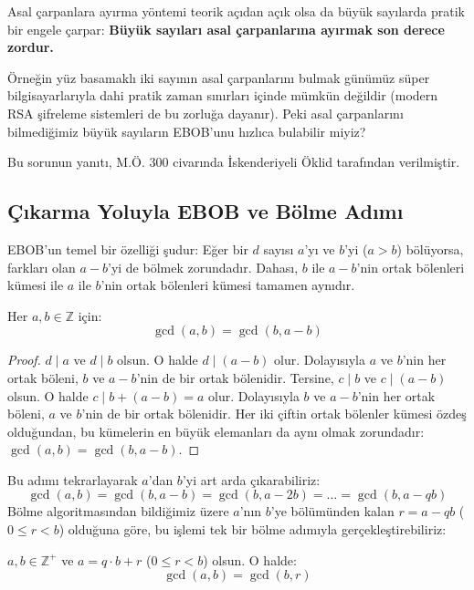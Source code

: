 Asal çarpanlara ayırma yöntemi teorik açıdan açık olsa da büyük sayılarda pratik bir engele çarpar: \textbf{Büyük sayıları asal çarpanlarına ayırmak son derece zordur.}

Örneğin yüz basamaklı iki sayının asal çarpanlarını bulmak günümüz süper bilgisayarlarıyla dahi pratik zaman sınırları içinde mümkün değildir (modern RSA şifreleme sistemleri de bu zorluğa dayanır). Peki asal çarpanlarını bilmediğimiz büyük sayıların EBOB'unu hızlıca bulabilir miyiz?

Bu sorunun yanıtı, M.Ö. 300 civarında İskenderiyeli Öklid tarafından verilmiştir.

\subsection*{Çıkarma Yoluyla EBOB ve Bölme Adımı}

EBOB'un temel bir özelliği şudur: Eğer bir $d$ sayısı $a$'yı ve $b$'yi ($a > b$) bölüyorsa, farkları olan $a - b$'yi de bölmek zorundadır. Dahası, $b$ ile $a - b$'nin ortak bölenleri kümesi ile $a$ ile $b$'nin ortak bölenleri kümesi tamamen aynıdır.

\begin{theorem}
Her $a, b \in \mathbb{Z}$ için:
\[ \gcd(a, b) = \gcd(b, a - b) \]
\end{theorem}

\begin{proof}
$d \mid a$ ve $d \mid b$ olsun. O halde $d \mid (a - b)$ olur. Dolayısıyla $a$ ve $b$'nin her ortak böleni, $b$ ve $a - b$'nin de bir ortak bölenidir.
Tersine, $c \mid b$ ve $c \mid (a - b)$ olsun. O halde $c \mid b + (a - b) = a$ olur. Dolayısıyla $b$ ve $a - b$'nin her ortak böleni, $a$ ve $b$'nin de bir ortak bölenidir.
Her iki çiftin ortak bölenler kümesi özdeş olduğundan, bu kümelerin en büyük elemanları da aynı olmak zorundadır: $\gcd(a, b) = \gcd(b, a - b)$.
\end{proof}

Bu adımı tekrarlayarak $a$'dan $b$'yi art arda çıkarabiliriz:
\[ \gcd(a, b) = \gcd(b, a - b) = \gcd(b, a - 2b) = \dots = \gcd(b, a - qb) \]
Bölme algoritmasından bildiğimiz üzere $a$'nın $b$'ye bölümünden kalan $r = a - qb$ ($0 \le r < b$) olduğuna göre, bu işlemi tek bir bölme adımıyla gerçekleştirebiliriz:

\begin{theorem}
\label{thm:euclid-step}
$a, b \in \mathbb{Z}^+$ ve $a = q \cdot b + r$ ($0 \le r < b$) olsun. O halde:
\[ \gcd(a, b) = \gcd(b, r) \]
\end{theorem}

